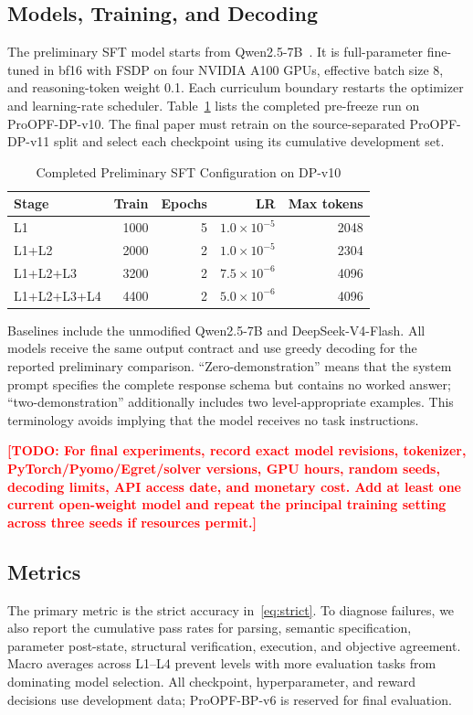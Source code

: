 \documentclass[lettersize,journal]{IEEEtran}
\newcommand{\drafttodo}[1]{\textcolor{red}{\textbf{[TODO: #1]}}}
\newcommand{\dataset}{ProOPF-DP-v11}
\newcommand{\benchmark}{ProOPF-BP-v6}
\begin{document}
\subsection{Models, Training, and Decoding}
The preliminary SFT model starts from Qwen2.5-7B~\cite{qwen25}. It is full-parameter fine-tuned in bf16 with FSDP on four NVIDIA A100 GPUs, effective batch size 8, and reasoning-token weight 0.1. Each curriculum boundary restarts the optimizer and learning-rate scheduler. Table~\ref{tab:prelim-train} lists the completed pre-freeze run on ProOPF-DP-v10. The final paper must retrain on the source-separated \dataset{} split and select each checkpoint using its cumulative development set.

\begin{table}[!t]
\caption{Completed Preliminary SFT Configuration on DP-v10}
\label{tab:prelim-train}
\centering
\footnotesize
\setlength{\tabcolsep}{3.5pt}
\begin{tabular}{@{}lrrrr@{}}
\toprule
Stage & Train & Epochs & LR & Max tokens \\
\midrule
L1 & 1000 & 5 & $1.0\!\times\!10^{-5}$ & 2048 \\
L1+L2 & 2000 & 2 & $1.0\!\times\!10^{-5}$ & 2304 \\
L1+L2+L3 & 3200 & 2 & $7.5\!\times\!10^{-6}$ & 4096 \\
L1+L2+L3+L4 & 4400 & 2 & $5.0\!\times\!10^{-6}$ & 4096 \\
\bottomrule
\end{tabular}
\end{table}

Baselines include the unmodified Qwen2.5-7B and DeepSeek-V4-Flash. All models receive the same output contract and use greedy decoding for the reported preliminary comparison. ``Zero-demonstration'' means that the system prompt specifies the complete response schema but contains no worked answer; ``two-demonstration'' additionally includes two level-appropriate examples. This terminology avoids implying that the model receives no task instructions.

\drafttodo{For final experiments, record exact model revisions, tokenizer, PyTorch/Pyomo/Egret/solver versions, GPU hours, random seeds, decoding limits, API access date, and monetary cost. Add at least one current open-weight model and repeat the principal training setting across three seeds if resources permit.}

\subsection{Metrics}
The primary metric is the strict accuracy in~\eqref{eq:strict}. To diagnose failures, we also report the cumulative pass rates for parsing, semantic specification, parameter post-state, structural verification, execution, and objective agreement. Macro averages across L1--L4 prevent levels with more evaluation tasks from dominating model selection. All checkpoint, hyperparameter, and reward decisions use development data; \benchmark{} is reserved for final evaluation.
\end{document}
